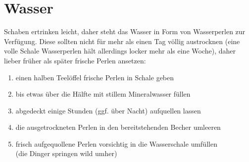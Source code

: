 \section{Wasser}
Schaben ertrinken leicht, daher steht das Wasser in Form von Wasserperlen zur Verfügung.
Diese sollten nicht für mehr als einen Tag völlig austrocknen
(eine volle Schale Wasserperlen hält allerdings locker mehr als eine Woche),
daher lieber früher als später frische Perlen ansetzen:
\begin{enumerate}
  \item einen halben Teelöffel frische Perlen in Schale geben
  \item bis etwas über die Hälfte mit stillem Mineralwasser füllen
  \item abgedeckt einige Stunden (ggf. über Nacht) aufquellen lassen
  \item die ausgetrockneten Perlen in den bereitstehenden Becher umleeren
  \item frisch aufgequollene Perlen vorsichtig in die Wasserschale umfüllen\\
        (die Dinger springen wild umher)
\end{enumerate}
